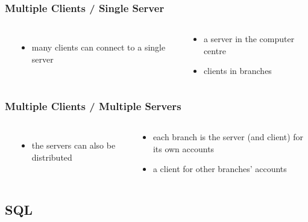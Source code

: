 \documentclass[dvipsnames]{beamer}
\theoremstyle{plain}
\begin{document}
\begin{frame}
  \frametitle{Multiple Clients / Single Server}

  \begin{columns}
    \begin{center}
    \end{center}

    \begin{itemize}
      \item many clients can connect to a single server
    \end{itemize}

    \pause
    \bigskip
    \begin{example}[Bank]
      \begin{itemize}
        \item a server in the computer centre
        \item clients in branches
      \end{itemize}
    \end{example}
  \end{columns}
\end{frame}

\begin{frame}
  \frametitle{Multiple Clients / Multiple Servers}

  \begin{columns}
    \begin{center}
    \end{center}

    \begin{itemize}
      \item the servers can also be distributed
    \end{itemize}

    \pause
    \bigskip
    \begin{example}[Bank]
      \begin{itemize}
        \item each branch is the server (and client) for its own accounts
        \item a client for other branches' accounts
      \end{itemize}
    \end{example}
  \end{columns}
\end{frame}

\subsection{SQL}
\end{document}

